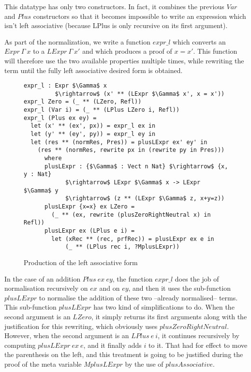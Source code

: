 This datatype has only two constructors. In fact, it combines the previous $Var$ and $Plus$ constructors so that it becomes impossible to write an expression which isn't left associative (because LPlus is only recursive on its first argument).
 
As part of the normalization, we write a function $expr\_l$ which converts an $Expr\ \Gamma\ x$ to a $LExpr\ \Gamma\ x'$ and which produces a proof of $x=x'$. This function will therefore use the two available properties multiple times, while rewriting the term until the fully left associative desired form is obtained.

\begin{figure}[H]
\figrule
\begin{center}
\begin{lstlisting}
expr_l : Expr $\Gamma$ x 
         $\rightarrow$ (x' ** (LExpr $\Gamma$ x', x = x'))
expr_l Zero = (_ ** (LZero, Refl))
expr_l (Var i) = (_ ** (LPlus LZero i, Refl))
expr_l (Plus ex ey) = 
  let (x' ** (ex', px)) = expr_l ex in
  let (y' ** (ey', py)) = expr_l ey in
  let (res ** (normRes, Pres)) = plusLExpr ex' ey' in
    (res ** (normRes, rewrite px in (rewrite py in Pres)))
      where 
      plusLExpr : {$\Gamma$ : Vect n Nat} $\rightarrow$ {x, y : Nat} 
            $\rightarrow$ LExpr $\Gamma$ x -> LExpr $\Gamma$ y  
            $\rightarrow$ (z ** (LExpr $\Gamma$ z, x+y=z))
      plusLExpr {x=x} ex LZero =
        (_ ** (ex, rewrite (plusZeroRightNeutral x) in Refl))            
      plusLExpr ex (LPlus e i) =
        let (xRec ** (rec, prfRec)) = plusLExpr ex e in
            (_ ** (LPlus rec i, ?MplusLExpr))

\end{lstlisting}
\end{center}
\caption{Production of the left associative form}
\figrule
\end{figure}
In the case of an addition $Plus\ ex\ ey$, the function $expr\_l$ does the job of normalisation recursively on $ex$ and on $ey$, and then it uses the sub-function $plusLExpr$ to normalise the addition of these two --already normalised-- terms. This sub-function $plusLExpr$ has two kind of simplifications to do. When the second argument is an $LZero$, it simply returns its first arguments along with the justification for this rewriting, which obviously uses $plusZeroRightNeutral$. However, when the second argument is an $LPlus\ e\ i$, it continues recursively by computing $plusLExpr\ ex\ e$, and it finally adds $i$ to it. That had for effect to move the parenthesis on the left, and this treatment is going to be justified during the proof of the meta variable $MplusLExpr$ by the use of $plusAssociative$.

